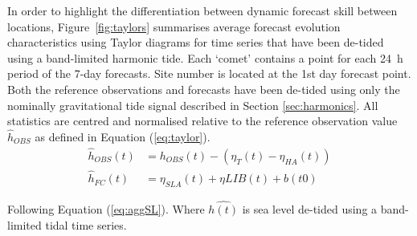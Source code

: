 In order to highlight the differentiation between dynamic forecast skill between locations, Figure~\ref{fig:taylors} summarises average forecast evolution characteristics using Taylor diagrams \citep{Taylor:2000wp} for time series that have been de-tided using a band-limited harmonic tide.
Each `comet' contains a point for each 24~h period of the 7-day forecasts.
Site number is located at the 1st day forecast point.
Both the reference observations and forecasts have been de-tided using only the nominally gravitational tide signal described in Section \ref{sec:harmonics}.
All statistics are centred and normalised relative to the reference observation value $\hat{h}_{OBS}$ as defined in Equation (\ref{eq:taylor}).
\begin{equation}
\begin{split}
\hat{h}_{OBS}(t) &= h_{OBS}(t) - (\eta_{T}(t) - \eta_{HA}(t))  \\ 
\hat{h}_{FC}(t)  &= \eta_{SLA}(t) + \eta{LIB}(t) + b(t0) 
\label{eq:taylor}
\end{split}
\end{equation}

Following Equation (\ref {eq:aggSL}).  Where $\hat{h(t)}$ is sea level de-tided using a band-limited tidal time series.  

